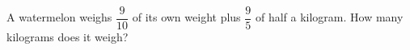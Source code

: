 A watermelon weighs $\dfrac9{10}$ of its own weight plus $\dfrac95$ of half a kilogram. How many kilograms does it weigh?
